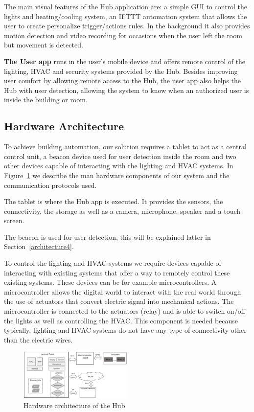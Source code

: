 \documentclass[conference]{IEEEtran}
\begin{document}
The main visual features of the Hub application are: a simple \ac{GUI} to control the lights and heating/cooling system, an \ac{IFTTT} automation system that allows the user to create personalize trigger/actions rules. In the background it also provides motion detection and video recording for occasions when the user left the room but movement is detected.

\textbf{The User app} runs in the user's mobile device and offers remote control of the lighting, \ac{HVAC} and security systems provided by the Hub. Besides improving user comfort by allowing remote access to the Hub, the user app also helps the Hub with user detection, allowing the system to know when an authorized user is inside the building or room.

\subsection{Hardware Architecture}

To achieve building automation, our solution requires a tablet to act as a central control unit, a beacon device used for user detection inside the room and two other devices capable of interacting with the lighting and \ac{HVAC} systems. In Figure~\ref{hard_architecture_system} we describe the man hardware components of our system and the communication protocols used.

The tablet is where the Hub app is executed. It provides the sensors, the connectivity, the storage as well as a camera, microphone, speaker and a touch screen. 

The beacon is used for user detection, this will be explained latter in Section~\ref{architecture4}.

To control the lighting and \ac{HVAC} systems we require devices capable of interacting with existing systems that offer a way to remotely control these existing systems. These devices can be for example microcontrollers. A microcontroller allows the digital world to interact with the real world through the use of actuators that convert electric signal into mechanical actions. The microcontroller is connected to the actuators (relay) and is able to switch on/off the lights as well as controlling the HVAC. This component is needed because typically, lighting and HVAC systems do not have any type of connectivity other than the electric wires. 

\begin{figure}[h]
\centering
\includegraphics[width=0.5\textwidth]{Figures/arch_hardware}
\caption{Hardware architecture of the Hub}
\label{hard_architecture_system}
\end{figure}
\end{document}
